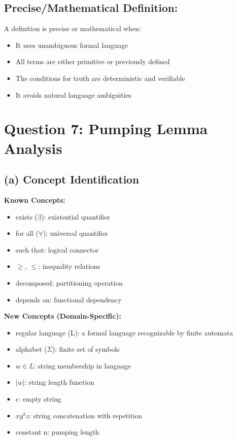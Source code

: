 \documentclass[12pt]{article}
\theoremstyle{definition}
\begin{document}
\subsection*{Precise/Mathematical Definition:}
A definition is precise or mathematical when:
\begin{itemize}
    \item It uses unambiguous formal language
    \item All terms are either primitive or previously defined
    \item The conditions for truth are deterministic and verifiable
    \item It avoids natural language ambiguities
\end{itemize}

\section*{Question 7: Pumping Lemma Analysis}

\subsection*{(a) Concept Identification}

\textbf{Known Concepts:}
\begin{itemize}
    \item exists ($\exists$): existential quantifier
    \item for all ($\forall$): universal quantifier
    \item such that: logical connector
    \item $\geq$, $\leq$: inequality relations
    \item decomposed: partitioning operation
    \item depends on: functional dependency
\end{itemize}

\textbf{New Concepts (Domain-Specific):}
\begin{itemize}
    \item regular language (L): a formal language recognizable by finite automata
    \item alphabet ($\Sigma$): finite set of symbols
    \item $w \in L$: string membership in language
    \item $|w|$: string length function
    \item $\epsilon$: empty string
    \item $xy^kz$: string concatenation with repetition
    \item constant n: pumping length
\end{itemize}
\end{document}
